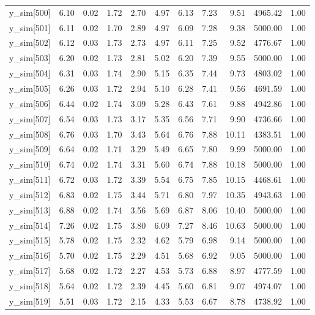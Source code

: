 \begin{table}[ht]
\begin{tabular}{rrrrrrrrrrr}
  y\_sim[500] & 6.10 & 0.02 & 1.72 & 2.70 & 4.97 & 6.13 & 7.23 & 9.51 & 4965.42 & 1.00 \\ 
  y\_sim[501] & 6.11 & 0.02 & 1.70 & 2.89 & 4.97 & 6.09 & 7.28 & 9.38 & 5000.00 & 1.00 \\ 
  y\_sim[502] & 6.12 & 0.03 & 1.73 & 2.73 & 4.97 & 6.11 & 7.25 & 9.52 & 4776.67 & 1.00 \\ 
  y\_sim[503] & 6.20 & 0.02 & 1.73 & 2.81 & 5.02 & 6.20 & 7.39 & 9.55 & 5000.00 & 1.00 \\ 
  y\_sim[504] & 6.31 & 0.03 & 1.74 & 2.90 & 5.15 & 6.35 & 7.44 & 9.73 & 4803.02 & 1.00 \\ 
  y\_sim[505] & 6.26 & 0.03 & 1.72 & 2.94 & 5.10 & 6.28 & 7.41 & 9.56 & 4691.59 & 1.00 \\ 
  y\_sim[506] & 6.44 & 0.02 & 1.74 & 3.09 & 5.28 & 6.43 & 7.61 & 9.88 & 4942.86 & 1.00 \\ 
  y\_sim[507] & 6.54 & 0.03 & 1.73 & 3.17 & 5.35 & 6.56 & 7.71 & 9.90 & 4736.66 & 1.00 \\ 
  y\_sim[508] & 6.76 & 0.03 & 1.70 & 3.43 & 5.64 & 6.76 & 7.88 & 10.11 & 4383.51 & 1.00 \\ 
  y\_sim[509] & 6.64 & 0.02 & 1.71 & 3.29 & 5.49 & 6.65 & 7.80 & 9.99 & 5000.00 & 1.00 \\ 
  y\_sim[510] & 6.74 & 0.02 & 1.74 & 3.31 & 5.60 & 6.74 & 7.88 & 10.18 & 5000.00 & 1.00 \\ 
  y\_sim[511] & 6.72 & 0.03 & 1.72 & 3.39 & 5.54 & 6.75 & 7.85 & 10.15 & 4468.61 & 1.00 \\ 
  y\_sim[512] & 6.83 & 0.02 & 1.75 & 3.44 & 5.71 & 6.80 & 7.97 & 10.35 & 4943.63 & 1.00 \\ 
  y\_sim[513] & 6.88 & 0.02 & 1.74 & 3.56 & 5.69 & 6.87 & 8.06 & 10.40 & 5000.00 & 1.00 \\ 
  y\_sim[514] & 7.26 & 0.02 & 1.75 & 3.80 & 6.09 & 7.27 & 8.46 & 10.63 & 5000.00 & 1.00 \\ 
  y\_sim[515] & 5.78 & 0.02 & 1.75 & 2.32 & 4.62 & 5.79 & 6.98 & 9.14 & 5000.00 & 1.00 \\ 
  y\_sim[516] & 5.70 & 0.02 & 1.75 & 2.29 & 4.51 & 5.68 & 6.92 & 9.05 & 5000.00 & 1.00 \\ 
  y\_sim[517] & 5.68 & 0.02 & 1.72 & 2.27 & 4.53 & 5.73 & 6.88 & 8.97 & 4777.59 & 1.00 \\ 
  y\_sim[518] & 5.64 & 0.02 & 1.72 & 2.39 & 4.45 & 5.60 & 6.81 & 9.07 & 4974.07 & 1.00 \\ 
  y\_sim[519] & 5.51 & 0.03 & 1.72 & 2.15 & 4.33 & 5.53 & 6.67 & 8.78 & 4738.92 & 1.00 \\ 

\end{tabular}
\end{table}
